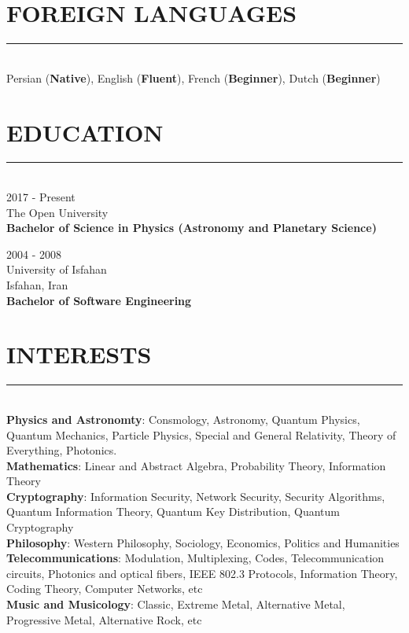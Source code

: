 \documentclass[10pt,a4paper]{article}
\begin{document}
\section{FOREIGN LANGUAGES}
\noindent \rule {18.0cm}{0.2pt} \\
    Persian (\textbf{Native}), English (\textbf{Fluent}), French (\textbf{Beginner}), Dutch (\textbf{Beginner}) \\

\section{EDUCATION}
\noindent \rule {18.0cm}{0.2pt} \\
\textbullet \hspace{0.1cm} 2017 - Present \\
The Open University \\
\textbf{Bachelor of Science in Physics (Astronomy and Planetary Science)}
\vspace{0.3cm}

\noindent \textbullet \hspace{0.1cm}  2004 - 2008 \\
University of Isfahan \\
Isfahan, Iran \\
\textbf{Bachelor of Software Engineering}


\section{INTERESTS}
\noindent \rule {18.0cm}{0.2pt} \\
\textbullet \hspace{0.1cm} \textbf{Physics and Astronomty}: Consmology, Astronomy, Quantum Physics, Quantum Mechanics, Particle Physics, Special and General Relativity, Theory of Everything, Photonics. \\
\textbullet \hspace{0.1cm} \textbf{Mathematics}: Linear and Abstract Algebra, Probability Theory, Information Theory \\
\textbullet \hspace{0.1cm} \textbf{Cryptography}: Information Security, Network Security, Security Algorithms, Quantum Information Theory, Quantum Key Distribution, Quantum Cryptography \\
\textbullet \hspace{0.1cm} \textbf{Philosophy}: Western Philosophy, Sociology, Economics, Politics and Humanities \\
\textbullet \hspace{0.1cm} \textbf{Telecommunications}: Modulation, Multiplexing, Codes, Telecommunication circuits, Photonics and optical fibers, IEEE 802.3 Protocols, Information Theory, Coding Theory, Computer Networks, etc \\
\textbullet \hspace{0.1cm} \textbf{Music and Musicology}: Classic, Extreme Metal, Alternative Metal, Progressive Metal, Alternative Rock, etc
\end{document}
